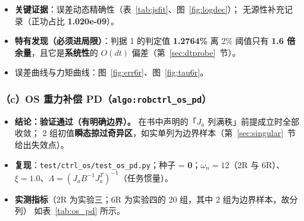 \documentclass[11pt,a4paper]{ctexart}
\begin{document}
\begin{table}[H]
\centering
\small
\caption{\texttt{js\_invdyn} 在 2R 与 6R 上的实测指标}\label{tab:js_invdyn}
\end{table}

\begin{itemize}[leftmargin=1.6em,itemsep=2pt]
\item \textbf{关键证据}：误差动态精确性（表~\ref{tab:jsfit}、图~\ref{fig:logdec}）；
  无源性补充记录（正功占比 \textbf{1.020e-09}）。
\item \textbf{特有发现（必须进局限）}：判据 1 的判定值 \textbf{1.2764\%} 离 2\% 阈值只有
  \textbf{1.6 倍余量}，且它是\textbf{系统性}的 $O(dt)$ 偏差（第~\ref{sec:dtprobe}~节）。
\item 误差曲线与力矩曲线：图~\ref{fig:err6r}、图~\ref{fig:tau6r}。
\end{itemize}

\subsubsection{（c）OS 重力补偿 PD（\texttt{algo:robctrl\_os\_pd}）}

\begin{itemize}[leftmargin=1.6em,itemsep=3pt]
\item \textbf{结论：验证通过（有明确边界）。} 在书中声明的「$J_a$ 列满秩」前提成立时全部收敛；
  2 组初值\textbf{瞬态掠过奇异区}，如实单列为边界样本（第~\ref{sec:singular}~节给出失效点）。
\item \textbf{复现}：\texttt{test/ctrl\_os/test\_os\_pd.py}；种子 = \textbf{0}；$\omega_n=12$（2R 与 6R）、
  $\xi=1.0$、$\Lambda=(J_aB^{-1}J_a^{T})^{-1}$（任务惯量）。
\item \textbf{实测指标}（2R 为实验三；6R 为实验四的 20 组，其中 2 组为边界样本，故分列）
  如表~\ref{tab:os_pd} 所示。
\end{itemize}
\end{document}
